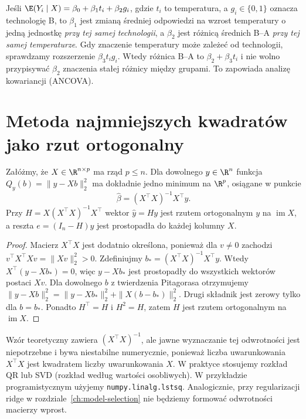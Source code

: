 \begin{przyklad}
Jeśli $\E(Y_i\mid X)=\beta_0+\beta_1t_i+\beta_2g_i$,
gdzie $t_i$ to temperatura, a $g_i\in\{0,1\}$ oznacza
technologię B, to $\beta_1$ jest zmianą średniej odpowiedzi
na wzrost temperatury o jedną jednostkę \emph{przy tej samej
technologii}, a $\beta_2$ jest różnicą średnich B--A
\emph{przy tej samej temperaturze}. Gdy znaczenie temperatury
może zależeć od technologii, sprawdzamy rozszerzenie
$\beta_3t_ig_i$. Wtedy różnica B--A to
$\beta_2+\beta_3t_i$ i nie wolno przypisywać
$\beta_2$ znaczenia stałej różnicy między grupami.
To zapowiada analizę kowariancji (ANCOVA).
\end{przyklad}

\section{Metoda najmniejszych kwadratów jako rzut ortogonalny}
\begin{twierdzenie}
\label{thm:ols-formula}
Załóżmy, że $X\in\R^{n\times p}$ ma rząd $p\le n$.
Dla dowolnego $y\in\R^n$ funkcja
$Q_y(b)=\|y-Xb\|_2^2$ ma dokładnie jedno minimum
na $\R^p$, osiągane w punkcie
\[
 \widehat\beta=(X^\top X)^{-1}X^\top y.
\]
Przy $H=X(X^\top X)^{-1}X^\top$ wektor
$\widehat y=Hy$ jest rzutem ortogonalnym $y$ na
$\operatorname{im}X$, a reszta $e=(I_n-H)y$ jest
prostopadła do każdej kolumny $X$.
\end{twierdzenie}
\begin{proof}
Macierz $X^\top X$ jest dodatnio określona, ponieważ
dla $v\ne0$ zachodzi
$v^\top X^\top Xv=\|Xv\|_2^2>0$.
Zdefiniujmy $b_*=(X^\top X)^{-1}X^\top y$.
Wtedy $X^\top(y-Xb_*)=0$, więc $y-Xb_*$ jest
prostopadły do wszystkich wektorów postaci $Xv$.
Dla dowolnego $b$ z twierdzenia Pitagorasa otrzymujemy
$\|y-Xb\|_2^2=\|y-Xb_*\|_2^2+\|X(b-b_*)\|_2^2$.
Drugi składnik jest zerowy tylko dla $b=b_*$.
Ponadto $H^\top=H$ i $H^2=H$, zatem $H$ jest
rzutem ortogonalnym na $\operatorname{im}X$.
\end{proof}

\begin{uwaga}
Wzór teoretyczny zawiera $(X^\top X)^{-1}$, ale
jawne wyznaczanie tej odwrotności jest niepotrzebne i
bywa niestabilne numerycznie, ponieważ liczba uwarunkowania
$X^\top X$ jest kwadratem liczby uwarunkowania $X$.
W praktyce stosujemy rozkład QR lub SVD (rozkład według
wartości osobliwych). W przykładzie programistycznym
użyjemy \texttt{numpy.linalg.lstsq}. Analogicznie,
przy regularizacji ridge w rozdziale~\ref{ch:model-selection}
nie będziemy formować odwrotności macierzy wprost.
\end{uwaga}

